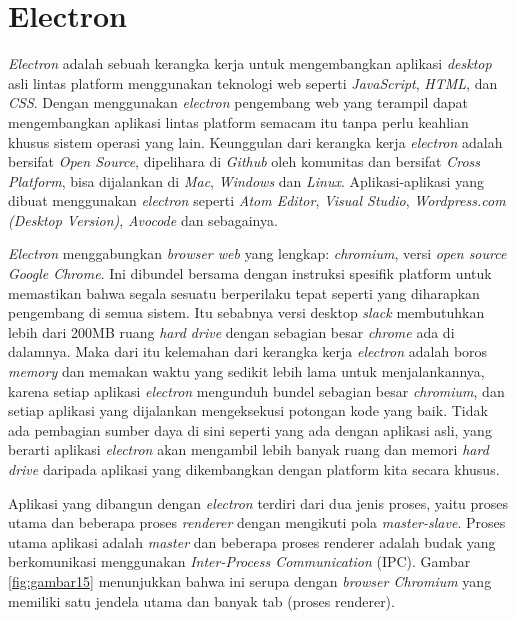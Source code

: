 \newpage
\section{Electron}
\textit{Electron} adalah sebuah kerangka kerja untuk mengembangkan aplikasi \textit{desktop} asli lintas platform menggunakan teknologi web seperti \textit{JavaScript}, \textit{HTML}, dan \textit{CSS}. Dengan menggunakan \textit{electron} pengembang web yang terampil dapat mengembangkan aplikasi lintas platform semacam itu tanpa perlu keahlian khusus sistem operasi yang lain. Keunggulan dari kerangka kerja \textit{electron} adalah bersifat \textit{Open Source}, dipelihara di \textit{Github} oleh komunitas dan bersifat \textit{Cross Platform}, bisa dijalankan di \textit{Mac}, \textit{Windows} dan \textit{Linux}. Aplikasi-aplikasi yang dibuat menggunakan \textit{electron} seperti \textit{Atom Editor}, \textit{Visual Studio}, \textit{Wordpress.com (Desktop Version)}, \textit{Avocode} dan sebagainya.

\textit{Electron} menggabungkan \textit{browser web} yang lengkap: \textit{chromium}, versi \textit{open source Google Chrome}. Ini dibundel bersama dengan instruksi spesifik platform untuk memastikan bahwa segala sesuatu berperilaku tepat seperti yang diharapkan pengembang di semua sistem. Itu sebabnya versi desktop \textit{slack} membutuhkan lebih dari 200MB ruang \textit{hard drive} dengan sebagian besar \textit{chrome} ada di dalamnya. Maka dari itu kelemahan dari kerangka kerja \textit{electron} adalah boros \textit{memory} dan memakan waktu yang sedikit lebih lama untuk menjalankannya, karena setiap aplikasi \textit{electron} mengunduh bundel sebagian besar \textit{chromium}, dan setiap aplikasi yang dijalankan mengeksekusi potongan kode yang baik. Tidak ada pembagian sumber daya di sini seperti yang ada dengan aplikasi asli, yang berarti aplikasi \textit{electron} akan mengambil lebih banyak ruang dan memori \textit{hard drive} daripada aplikasi yang dikembangkan dengan platform kita secara khusus.

Aplikasi yang dibangun dengan \textit{electron} terdiri dari dua jenis proses, yaitu proses utama dan beberapa proses  \textit{renderer} dengan mengikuti pola \textit{master-slave}. Proses utama aplikasi adalah \textit{master} dan beberapa proses renderer adalah budak yang berkomunikasi menggunakan \textit{Inter-Process Communication} (IPC). Gambar \ref{fig:gambar15} menunjukkan bahwa ini serupa dengan \textit{browser Chromium} yang memiliki satu jendela utama dan banyak tab (proses renderer).

